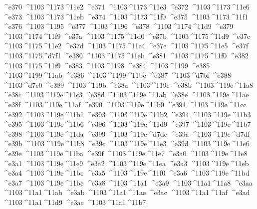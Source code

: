 \checkit ^^^^e370 ^^^^1103^^^^1173^^^^11e2
\checkit ^^^^e371 ^^^^1103^^^^1173^^^^11e3
\checkit ^^^^e372 ^^^^1103^^^^1173^^^^11e6
\checkit ^^^^e373 ^^^^1103^^^^1173^^^^11eb
\checkit ^^^^e374 ^^^^1103^^^^1173^^^^11f0
\checkit ^^^^e375 ^^^^1103^^^^1173^^^^11f1
\checkit ^^^^e376 ^^^^1103^^^^1195
\checkit ^^^^e377 ^^^^1103^^^^1196
\checkit ^^^^e378 ^^^^1103^^^^1174^^^^11d9
\checkit ^^^^e379 ^^^^1103^^^^1174^^^^11f9
\checkit ^^^^e37a ^^^^1103^^^^1175^^^^11d0
\checkit ^^^^e37b ^^^^1103^^^^1175^^^^11d9
\checkit ^^^^e37c ^^^^1103^^^^1175^^^^11e2
\checkit ^^^^e37d ^^^^1103^^^^1175^^^^11e4
\checkit ^^^^e37e ^^^^1103^^^^1175^^^^11e5
\checkit ^^^^e37f ^^^^1103^^^^1175^^^^d7f1
\checkit ^^^^e380 ^^^^1103^^^^1175^^^^11eb
\checkit ^^^^e381 ^^^^1103^^^^1175^^^^11f0
\checkit ^^^^e382 ^^^^1103^^^^1175^^^^11f9
\checkit ^^^^e383 ^^^^1103^^^^1198
\checkit ^^^^e384 ^^^^1103^^^^1199
\checkit ^^^^e385 ^^^^1103^^^^1199^^^^11ab
\checkit ^^^^e386 ^^^^1103^^^^1199^^^^11bc
\checkit ^^^^e387 ^^^^1103^^^^d7bf
\checkit ^^^^e388 ^^^^1103^^^^d7c0
\checkit ^^^^e389 ^^^^1103^^^^119b
\checkit ^^^^e38a ^^^^1103^^^^119e
\checkit ^^^^e38b ^^^^1103^^^^119e^^^^11a8
\checkit ^^^^e38c ^^^^1103^^^^119e^^^^11c3
\checkit ^^^^e38d ^^^^1103^^^^119e^^^^11ab
\checkit ^^^^e38e ^^^^1103^^^^119e^^^^11ae
\checkit ^^^^e38f ^^^^1103^^^^119e^^^^11af
\checkit ^^^^e390 ^^^^1103^^^^119e^^^^11b0
\checkit ^^^^e391 ^^^^1103^^^^119e^^^^11cc
\checkit ^^^^e392 ^^^^1103^^^^119e^^^^11b1
\checkit ^^^^e393 ^^^^1103^^^^119e^^^^11b2
\checkit ^^^^e394 ^^^^1103^^^^119e^^^^11b3
\checkit ^^^^e395 ^^^^1103^^^^119e^^^^11b6
\checkit ^^^^e396 ^^^^1103^^^^119e^^^^11d9
\checkit ^^^^e397 ^^^^1103^^^^119e^^^^11b7
\checkit ^^^^e398 ^^^^1103^^^^119e^^^^11da
\checkit ^^^^e399 ^^^^1103^^^^119e^^^^d7de
\checkit ^^^^e39a ^^^^1103^^^^119e^^^^d7df
\checkit ^^^^e39b ^^^^1103^^^^119e^^^^11b8
\checkit ^^^^e39c ^^^^1103^^^^119e^^^^11e3
\checkit ^^^^e39d ^^^^1103^^^^119e^^^^11e6
\checkit ^^^^e39e ^^^^1103^^^^119e^^^^11ba
\checkit ^^^^e39f ^^^^1103^^^^119e^^^^11e7
\checkit ^^^^e3a0 ^^^^1103^^^^119e^^^^11e8
\checkit ^^^^e3a1 ^^^^1103^^^^119e^^^^11e9
\checkit ^^^^e3a2 ^^^^1103^^^^119e^^^^11ea
\checkit ^^^^e3a3 ^^^^1103^^^^119e^^^^11eb
\checkit ^^^^e3a4 ^^^^1103^^^^119e^^^^11bc
\checkit ^^^^e3a5 ^^^^1103^^^^119e^^^^11f0
\checkit ^^^^e3a6 ^^^^1103^^^^119e^^^^11bd
\checkit ^^^^e3a7 ^^^^1103^^^^119e^^^^11be
\checkit ^^^^e3a8 ^^^^1103^^^^11a1
\checkit ^^^^e3a9 ^^^^1103^^^^11a1^^^^11a8
\checkit ^^^^e3aa ^^^^1103^^^^11a1^^^^11ab
\checkit ^^^^e3ab ^^^^1103^^^^11a1^^^^11ae
\checkit ^^^^e3ac ^^^^1103^^^^11a1^^^^11af
\checkit ^^^^e3ad ^^^^1103^^^^11a1^^^^11d9
\checkit ^^^^e3ae ^^^^1103^^^^11a1^^^^11b7

